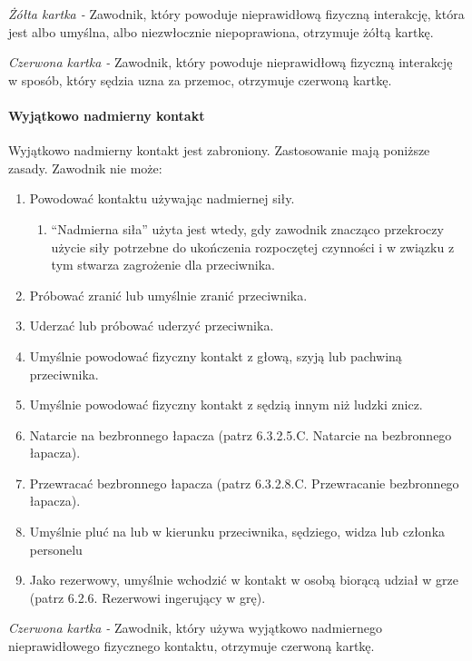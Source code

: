 \documentclass[12pt]{article}
\begin{document}
\emph{Żółta kartka -} Zawodnik, który powoduje nieprawidłową fizyczną
interakcję, która jest albo umyślna, albo niezwłocznie niepoprawiona,
otrzymuje żółtą kartkę.

\emph{Czerwona kartka -} Zawodnik, który powoduje nieprawidłową fizyczną
interakcję w sposób, który sędzia uzna za przemoc, otrzymuje czerwoną
kartkę.

\paragraph{Wyjątkowo nadmierny kontakt}
Wyjątkowo nadmierny
kontakt jest zabroniony. Zastosowanie mają poniższe zasady. Zawodnik nie
może:

\begin{enumerate}
	\item
	      Powodować kontaktu używając nadmiernej siły.

	      \begin{enumerate}
		      \item
		            ``Nadmierna siła'' użyta jest wtedy, gdy zawodnik znacząco
		            przekroczy użycie siły potrzebne do ukończenia rozpoczętej czynności
		            i w związku z tym stwarza zagrożenie dla przeciwnika.
	      \end{enumerate}
	\item
	      Próbować zranić lub umyślnie zranić przeciwnika.
	\item
	      Uderzać lub próbować uderzyć przeciwnika.
	\item
	      Umyślnie powodować fizyczny kontakt z głową, szyją lub pachwiną
	      przeciwnika.
	\item
	      Umyślnie powodować fizyczny kontakt z sędzią innym niż ludzki znicz.
	\item
	      Natarcie na bezbronnego łapacza (patrz 6.3.2.5.C. Natarcie na
	      bezbronnego łapacza).
	\item
	      Przewracać bezbronnego łapacza (patrz 6.3.2.8.C. Przewracanie
	      bezbronnego łapacza).
	\item
	      Umyślnie pluć na lub w kierunku przeciwnika, sędziego, widza lub
	      członka personelu
	\item
	      Jako rezerwowy, umyślnie wchodzić w kontakt w osobą biorącą udział w
	      grze (patrz 6.2.6. Rezerwowi ingerujący w grę).
\end{enumerate}

\emph{Czerwona kartka -} Zawodnik, który używa wyjątkowo nadmiernego
nieprawidłowego fizycznego kontaktu, otrzymuje czerwoną kartkę.
\end{document}

